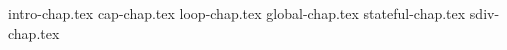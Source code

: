 \documentclass[degree=doctor,bibtype=numeric,degreetype=academic]{tongjithesis}
\begin{document}


\frontmatter

\makecover


\tableofcontents
% 

\listoffigures
\listoftables

\mainmatter
{intro-chap.tex}
{cap-chap.tex}
{loop-chap.tex}
{global-chap.tex}
{stateful-chap.tex}
{sdiv-chap.tex}





\backmatter

% 
\clearpage
\newpage
\mbox{}
\newpage

\printTJbibliography


\begin{appendix}
% 
\end{appendix}

\begin{resume}

\end{resume}
\end{document}
